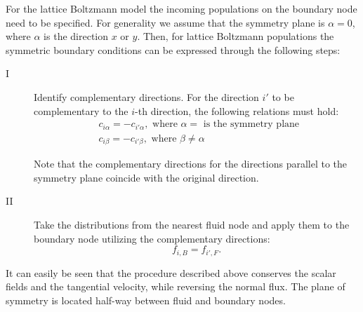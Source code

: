 \documentclass[preprint,12pt]{elsarticle}
\begin{document}
For the lattice Boltzmann model the incoming populations on the boundary node need to be specified.
For generality we assume that the symmetry plane is $\alpha=0$, where $\alpha$ is the
direction $x$ or $y$. Then, for lattice Boltzmann populations the symmetric boundary conditions can
be expressed through the following steps:
\begin{description}
\item[I] Identify complementary directions. For the direction $i'$ to be complementary to the $i$-th
direction, the following relations must hold:
\begin{equation}
\begin{aligned}
&c_{i\alpha}=-c_{i'\alpha}, \text{ where $\alpha=$ is the symmetry plane }\\
&c_{i\beta}=-c_{i'\beta}, \text{ where $\beta\neq\alpha$ }
\end{aligned}
\end{equation}

Note that the complementary directions for the directions parallel to the symmetry plane coincide
with the original direction.

\item[II] Take the distributions from the nearest fluid node and
apply them to the boundary node utilizing the complementary directions:
\begin{equation}
f_{i,B}=f_{i',F}.
\end{equation}
\end{description}

It can easily be seen that the procedure described above conserves the scalar fields and the tangential
velocity, while reversing the normal flux. The plane of symmetry is located half-way between fluid
and boundary nodes. 


\end{document}
